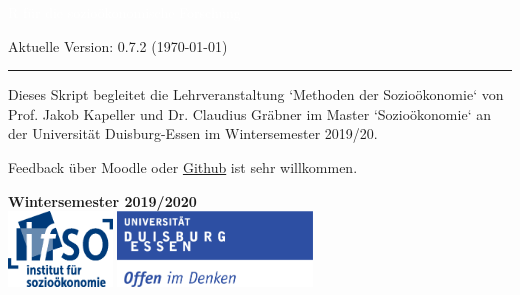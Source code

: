 \documentclass[letterpaper]{article}
\author{%
    Dr. Claudius Gr\"abner \\
    Institut f\"ur Sozio\"okonomie \\
    Universit\"at Duisburg-Essen\\
    \href{mailto:claudius.graebner@uni-due.com}{claudius.graebner@uni-due.com}\\
    \href{www.claudius-graebner.com}{https://claudius-graebner.com/}
    }
\makeatletter
\def\printauthor{%
    {\large \@author}}
\makeatother
\begin{document}
\begin{titlepage}
\BgThispage
{}
\vspace*{2cm}
\noindent
\onehalfspacing
\textcolor{white}{\bigsf R f\"ur die \mbox{sozio\"okonomische} Forschung}
\vspace*{1.2cm}\par
Aktuelle Version: 0.7.2 (\today)\\
\vspace*{2.0cm}\par
\noindent
\begin{minipage}{0.35\linewidth}
    \begin{flushright}
        \printauthor
    \end{flushright}
\end{minipage} \hspace{15pt}
%
\begin{minipage}{0.02\linewidth}
    \rule{1pt}{175pt}
\end{minipage} \hspace{-10pt}
%
\begin{minipage}{0.6\linewidth}
\vspace{5pt}
\begin{adjustwidth}{25pt}{25pt}
\raggedright
Dieses Skript begleitet die Lehrveranstaltung `Methoden der Sozio\"okonomie` von
Prof. Jakob Kapeller und Dr. Claudius Gr\"abner im Master `Sozio\"okonomie` an der
Universit\"at Duisburg-Essen im Wintersemester 2019/20.

Feedback \"uber Moodle oder
\href{https://github.com/graebnerc/RforSocioEcon}{Github} ist
sehr willkommen.
\end{adjustwidth}

\end{minipage}

\vspace{0.25cm}
\centering
\vspace{1.25cm}
\textbf{Wintersemester 2019/2020}\\
\vfill
\includegraphics[height=2cm]{ifso_logo_dt_RGB} \hspace{2cm}
\includegraphics[height=2cm]{logo_ude.pdf}
\end{titlepage}
\end{document}
